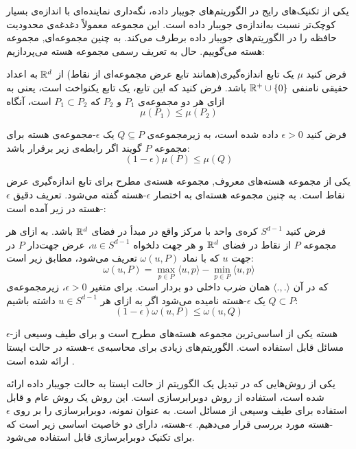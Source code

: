 

یکی از تکنیک‌های رایج در الگوریتم‌های جویبار داده، نگه‌داری نماینده‌ای با اندازه‌ی بسیار کوچک‌تر نسبت به‌اندازه‌ی جویبار داده است.
این مجموعه معمولاً دغدغه‌ی محدودیت حافظه را در الگوریتم‌های جویبار داده برطرف می‌کند. به چنین مجموعه‌ای, مجموعه هسته می‌گوییم.
حال به تعریف رسمی مجموعه هسته می‌پردازیم:


فرض کنید $\mu$ یک تابع اندازه‌گیری(همانند تابع عرض مجموعه‌ای از نقاط) از $\mathbb{R}^d$ به اعداد حقیقی نامنفی $\mathbb{R}^+ \cup \left\{ 0 \right\}$ باشد.
فرض کنید که این تابع، یک تابع یکنواخت است، یعنی به ازای هر دو مجموعه‌ی $P_1$ و $P_2$ که $P_1 \subset P_2$ است، آنگاه
$$\mu(P_1) \leq \mu(P_2)$$

فرض کنید $\epsilon > 0$ داده شده است، به زیرمجموعه‌ی $Q \subseteq P$ یک $\epsilon$-مجموعه‌ی هسته برای مجموعه $P$ گویند اگر رابطه‌ی زیر برقرار باشد:
$$(1 - \epsilon) \mu(P) \leq \mu (Q)$$


یکی از مجموعه هسته‌های معروف, مجموعه هسته‌ی مطرح برای تابع اندازه‌گیری عرض نقاط است. به چنین مجموعه هسته‌ای به اختصار $\epsilon$-هسته گفته می‌شود. تعریف دقیق $\epsilon$-هسته در زیر آمده است:


فرض کنید $S^{d-1}$ کره‌ی واحد با مرکز واقع در مبدأ در فضای $\mathbb{R}^d$ باشد.
به ازای هر مجموعه $P$ از‌ نقاط در فضای $\mathbb{R}^d$ و هر جهت دلخواه $u \in S^{d-1}$، عرض جهت‌دار $P$ در جهت $u$ که با نماد $\omega(u, P)$ تعریف می‌شود، مطابق زیر است:
$$\omega(u, P) = \max_{p \in P} \langle u, p\rangle - \min_{p \in P} \langle u, p \rangle$$
که در آن $\langle ., . \rangle$ همان ضرب داخلی دو بردار است.
برای متغیر $\epsilon > 0$، زیرمجموعه‌ی $Q \subset P$ یک $\epsilon$-هسته نامیده می‌شود اگر به ازای هر $u \in S^{d-1}$ داشته باشیم:
$$(1 - \epsilon) \omega(u, P) \leq \omega(u, Q)$$


$\epsilon$-هسته 
یکی از اساسی‌ترین مجموعه هسته‌های مطرح است و برای طیف وسیعی از مسائل قابل استفاده است.
الگوریتم‌های زیادی برای محاسبه‌ی $\epsilon$-هسته در حالت ایستا ارائه شده است . 

یکی از روش‌هایی که در تبدیل یک الگوریتم از حالت ایستا به حالت جویبار داده ارائه شده است، استفاده از روش دوبرابرسازی است.
این روش یک روش عام و قابل استفاده برای طیف وسیعی از مسائل است.
به عنوان نمونه، دوبرابرسازی را بر روی $\epsilon$-هسته مورد بررسی قرار می‌دهیم. $\epsilon$-هسته، دارای دو خاصیت اساسی زیر است که برای تکنیک دوبرابرسازی قابل استفاده می‌شود.


